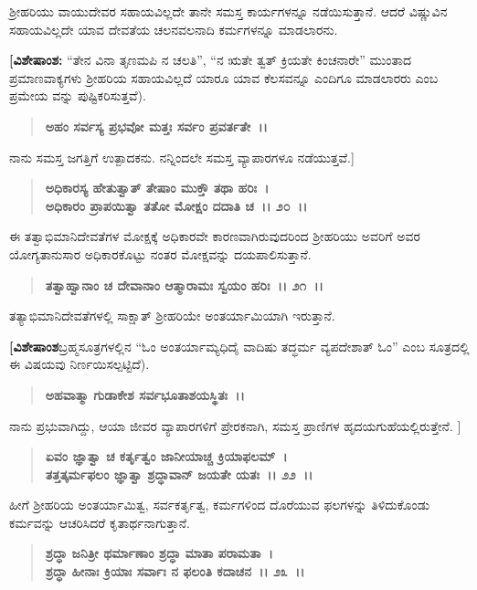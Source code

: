 ಶ‍್ರೀಹರಿಯು ವಾಯುದೇವರ ಸಹಾಯವಿಲ್ಲದೇ ತಾನೇ ಸಮಸ್ತ ಕಾರ್ಯಗಳನ್ನೂ ನಡೆಯಿಸುತ್ತಾನೆ. ಆದರೆ ವಿಷ್ಣುವಿನ ಸಹಾಯವಿಲ್ಲದೇ ಯಾವ ದೇವತೆಯ ಚಲನವಲನಾದಿ ಕರ್ಮಗಳನ್ನೂ ಮಾಡಲಾರನು.

\textbf{[ವಿಶೇಷಾಂಶ:} “ತೇನ ವಿನಾ ತೃಣಮಪಿ ನ ಚಲತಿ”, “ನ ಋತೇ ತ್ವತ್ ಕ್ರಿಯತೇ ಕಿಂಚನಾರೇ'' ಮುಂತಾದ ಪ್ರಮಾಣವಾಕ್ಯಗಳು ಶ‍್ರೀಹರಿಯ ಸಹಾಯವಿಲ್ಲದೆ ಯಾರೂ ಯಾವ ಕೆಲಸವನ್ನೂ ಎಂದಿಗೂ ಮಾಡಲಾರರು ಎಂಬ ಪ್ರಮೇಯ ವನ್ನು ಪುಷ್ಟಿಕರಿಸುತ್ತವೆ).

\begin{verse}
\textbf{ಅಹಂ ಸರ್ವಸ್ಯ ಪ್ರಭವೋ ಮತ್ತಃ ಸರ್ವಂ ಪ್ರವರ್ತತೇ~।।} 
\end{verse}

ನಾನು ಸಮಸ್ತ ಜಗತ್ತಿಗೆ ಉತ್ಪಾದಕನು. ನನ್ನಿಂದಲೇ ಸಮಸ್ತ ವ್ಯಾಪಾರಗಳೂ ನಡೆಯುತ್ತವೆ.]

\begin{verse}
\textbf{ಅಧಿಕಾರಸ್ಯ ಹೇತುತ್ವಾತ್ ತೇಷಾಂ ಮುಕ್ತೌ ತಥಾ ಹರಿಃ~।}\\\textbf{ಅಧಿಕಾರಂ ಪ್ರಾಪಯಿತ್ವಾ ತತೋ ಮೋಕ್ಷಂ ದದಾತಿ ಚ~।। ೨೦~।।}
\end{verse}

ಈ ತತ್ವಾಭಿಮಾನಿದೇವತೆಗಳ ಮೋಕ್ಷಕ್ಕೆ ಅಧಿಕಾರವೇ ಕಾರಣವಾಗಿರುವುದರಿಂದ ಶ‍್ರೀಹರಿಯು ಅವರಿಗೆ ಅವರ ಯೋಗ್ಯತಾನುಸಾರ ಅಧಿಕಾರಕೊಟ್ಟು ನಂತರ ಮೋಕ್ಷವನ್ನು ದಯಪಾಲಿಸುತ್ತಾನೆ.

\begin{verse}
\textbf{ತತ್ವಾಹ್ವಾನಾಂ ಚ ದೇವಾನಾಂ ಆತ್ಮಾರಾಮಃ ಸ್ವಯಂ ಹರಿಃ~।। ೨೧~।।}
\end{verse}

ತತ್ಯಾಭಿಮಾನಿದೇವತೆಗಳಲ್ಲಿ ಸಾಕ್ಷಾತ್ ಶ‍್ರೀಹರಿಯೇ ಅಂತರ್ಯಾಮಿಯಾಗಿ ಇರುತ್ತಾನೆ.

\textbf{[ವಿಶೇಷಾಂಶ\enginline{-}}ಬ್ರಹ್ಮಸೂತ್ರಗಳಲ್ಲಿನ “ಓಂ ಅಂತರ್ಯಾಮ್ಯಧಿದೈ ವಾದಿಷು ತದ್ಧರ್ಮ ವ್ಯಪದೇಶಾತ್ ಓಂ” ಎಂಬ ಸೂತ್ರದಲ್ಲಿ ಈ ವಿಷಯವು ನಿರ್ಣಯಿಸಲ್ಪಟ್ಟಿದೆ).

\begin{verse}
\textbf{ಅಹವಾತ್ಮಾ ಗುಡಾಕೇಶ ಸರ್ವಭೂತಾಶಯಸ್ಥಿತಃ~।।} 
\end{verse}

ನಾನು ಪ್ರಭುವಾಗಿದ್ದು, ಆಯಾ ಜೀವರ ವ್ಯಾಪಾರಗಳಿಗೆ ಪ್ರೇರಕನಾಗಿ, ಸಮಸ್ತ ಪ್ರಾಣಿಗಳ ಹೃದಯಗುಹೆಯಲ್ಲಿರುತ್ತೇನೆ. ]

\begin{verse}
\textbf{ಏವಂ ಜ್ಞಾತ್ವಾ ಚ ಕರ್ತೃತ್ವಂ ಜಾನೀಯಾಚ್ಚ ಕ್ರಿಯಾಫಲಮ್~।}\\\textbf{ತತ್ತತ್ಕರ್ಮಫಲಂ ಜ್ಞಾತ್ವಾ ಶ್ರದ್ಧಾವಾನ್ ಜಯತೇ ಯತಃ~।। ೨೨~।।}
\end{verse}

ಹೀಗೆ ಶ‍್ರೀಹರಿಯ ಅಂತರ್ಯಾಮಿತ್ವ, ಸರ್ವಕರ್ತೃತ್ವ, ಕರ್ಮಗಳಿಂದ ದೊರೆಯುವ ಫಲಗಳನ್ನು ತಿಳಿದುಕೊಂಡು ಕರ್ಮವನ್ನು ಆಚರಿಸಿದರೆ ಕೃತಾರ್ಥನಾಗುತ್ತಾನೆ.

\begin{verse}
\textbf{ಶ್ರದ್ಧಾ ಜನಿತ್ರೀ ಥರ್ಮಾಣಾಂ ಶ್ರದ್ಧಾ ಮಾತಾ ಪರಾಮತಾ~।}\\\textbf{ಶ್ರದ್ಧಾ ಹೀನಾಃ ಕ್ರಿಯಾಃ ಸರ್ವಾಃ ನ ಫಲಂತಿ ಕದಾಚನ~।। ೨೩~।।}
\end{verse}

